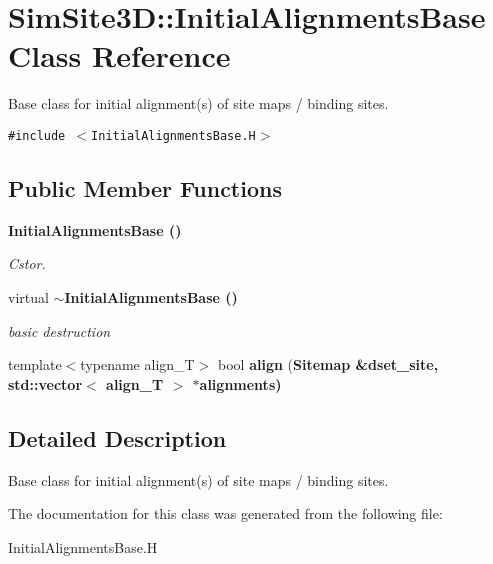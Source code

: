 \section{SimSite3D::Initial\-Alignments\-Base Class Reference}
\label{classSimSite3D_1_1InitialAlignmentsBase}
Base class for initial alignment(s) of site maps / binding sites.  


{\tt \#include $<$Initial\-Alignments\-Base.H$>$}

\subsection*{Public Member Functions}
\begin{CompactItemize}
\item 
\bf{Initial\-Alignments\-Base} ()\label{classSimSite3D_1_1InitialAlignmentsBase_5980fc0808725ed85537211cb846a527}

\begin{CompactList}\small\item\em Cstor. \item\end{CompactList}\item 
virtual \bf{$\sim$Initial\-Alignments\-Base} ()\label{classSimSite3D_1_1InitialAlignmentsBase_2bf277ae7d263c8116508e5e440c1896}

\begin{CompactList}\small\item\em basic destruction \item\end{CompactList}\item 
template$<$typename align\_\-T$>$ bool \textbf{align} (\bf{Sitemap} \&dset\_\-site, std::vector$<$ align\_\-T $>$ $\ast$alignments)\label{classSimSite3D_1_1InitialAlignmentsBase_7cfb90c844039c31f14e07fb3d814bb5}

\end{CompactItemize}


\subsection{Detailed Description}
Base class for initial alignment(s) of site maps / binding sites. 



The documentation for this class was generated from the following file:\begin{CompactItemize}
\item 
Initial\-Alignments\-Base.H\end{CompactItemize}
